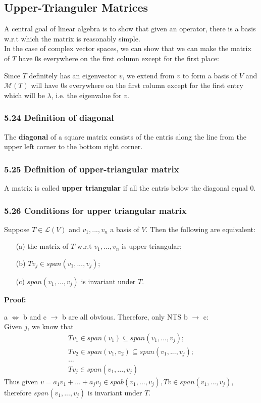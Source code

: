 \documentclass{article}
\begin{document}
\subsection*{Upper-Trianguler Matrices}
A central goal of linear algebra is to show that given an operator, there is a basis w.r.t which the matrix is reasonably simple.\\
In the case of complex vector spaces, we can show that we can make the matrix of $T$ have $0$s everywhere on the first column except for the first place:
\begin{addmargin}[1em]{0em}
    Since $T$ definitely has an eigenvector $v$, we extend from $v$ to form a basis of $V$ and $\mathcal{M}(T)$ will have $0$s everywhere on the first column except for the first entry which will be $\lambda$, i.e. the eigenvalue for $v$.
\end{addmargin}
\subsubsection*{5.24 Definition of diagonal}
The \textbf{diagonal} of a square matrix consists of the entris along the line from the upper left corner to the bottom right corner.
\subsubsection*{5.25 Definition of upper-triangular matrix}
A matrix is called \textbf{upper triangular } if all the entris below the diagonal equal $0$.
\subsubsection*{5.26 Conditions for upper triangular matrix}
Suppose $T \in \mathcal{L}(V)$ and $v_1, ..., v_n$ a basis of $V$. Then the following are equivalent:
\begin{itemize}
    \item[(a)] the matrix of $T$ w.r.t $v_1, ..., v_n$ is upper triangular;
    \item[(b)] $Tv_j \in span(v_1, ..., v_j)$;
    \item[(c)] $span(v_1, ..., v_j)$ is invariant under $T$.
\end{itemize}
\textbf{Proof:}
\begin{addmargin}[1em]{0em}
    a $\iff$ b and c $\rightarrow$ b are all obvious. Therefore, only NTS b $\rightarrow$ c:\\
    Given $j$, we know that
    \begin{equation*}
        \begin{split}
            Tv_1 \in span(v_1) \subseteq span(v_1, ..., v_j);\\
            Tv_2 \in span(v_1, v_2) \subseteq span(v_1, ..., v_j);\\
            ...\\
            Tv_j \in span(v_1, ..., v_j)
        \end{split}
    \end{equation*}
    Thus given $v = a_1v_1 + ... + a_jv_j \in spab(v_1, ..., v_j), Tv \in span(v_1, ..., v_j)$, therefore $span(v_1, ..., v_j)$ is invariant under $T$.
\end{addmargin}
\end{document}
